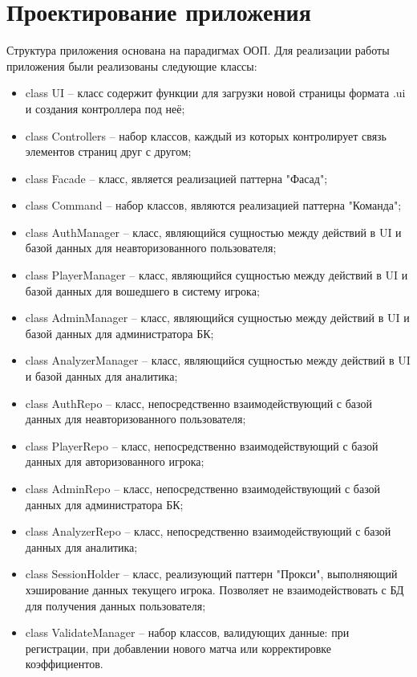 \section{Проектирование приложения}
Структура приложения основана на парадигмах ООП. 
Для реализации работы приложения были реализованы следующие классы:
\begin{itemize}
	\item class UI -- класс содержит функции для загрузки новой страницы формата .ui и создания контроллера под неё;
	\item class Controllers -- набор классов, каждый из которых контролирует связь элементов страниц друг с другом;
	\item class Facade -- класс, является реализацией паттерна "Фасад";
	\item class Command -- набор классов, являются реализацией паттерна "Команда";
	\item class AuthManager -- класс, являющийся сущностью между действий в UI и базой данных для неавторизованного пользователя;
	\item class PlayerManager -- класс, являющийся сущностью между действий в UI и базой данных для вошедшего в систему игрока;
	\item class AdminManager -- класс, являющийся сущностью между действий в UI и базой данных для администратора БК;
	\item class AnalyzerManager -- класс, являющийся сущностью между действий в UI и базой данных для аналитика;
	\item class AuthRepo -- класс, непосредственно взаимодействующий с базой данных для неавторизованного пользователя; 
	\item class PlayerRepo -- класс, непосредственно взаимодействующий с базой данных для авторизованного игрока; 
	\item class AdminRepo -- класс, непосредственно взаимодействующий с базой данных для администратора БК; 
	\item class AnalyzerRepo -- класс, непосредственно взаимодействующий с базой данных для аналитика; 
	\item class SessionHolder -- класс, реализующий паттерн "Прокси", выполняющий хэширование данных текущего игрока. Позволяет не взаимодействовать с БД для получения данных пользователя;
	\item class ValidateManager -- набор классов, валидующих данные: при регистрации, при добавлении нового матча или корректировке коэффициентов.
\end{itemize}

